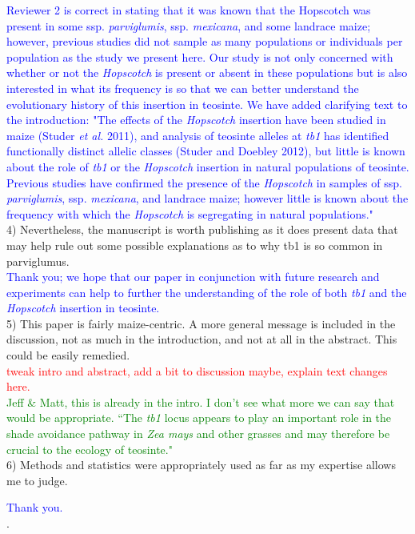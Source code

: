 \documentclass[11pt]{article}
\newcommand{\res}[1]{\noindent \textcolor{blue}{{#1}} \\}
\newcommand{\jri}[1]{\noindent \textcolor{red}{{#1}} \\}
\newcommand{\lev}[1]{\noindent \textcolor{green}{{#1}} \\}
\begin{document}
\res{Reviewer 2 is correct in stating that it was known that the Hopscotch was present in some ssp. \emph{parviglumis}, ssp. \emph{mexicana}, and some landrace maize; however, previous studies did not sample as many populations or individuals per population as the study we present here. Our study is not only concerned with whether or not the \emph{Hopscotch} is present or absent in these populations but is also interested in what its frequency is so that we can better understand the evolutionary history of this insertion in teosinte. We have added clarifying text to the introduction: "The effects of the \emph{Hopscotch} insertion have been studied in maize (Studer \emph{et al.} 2011), and analysis of teosinte alleles at \emph{tb1} has identified functionally distinct allelic classes (Studer and Doebley 2012), but little is known about the role of \emph{tb1} or the \emph{Hopscotch} insertion in natural populations of teosinte. Previous studies have confirmed the presence of the \emph{Hopscotch} in samples of ssp. \emph{parviglumis}, ssp. \emph{mexicana}, and landrace maize; however little is known about the frequency with which the \emph{Hopscotch} is segregating in natural populations."}


4) Nevertheless, the manuscript is worth publishing as it does present data that may help rule out some possible explanations as to why tb1 is so common in parviglumus.\\

\res{Thank you; we hope that our paper in conjunction with future research and experiments can help to further the understanding of the role of both \emph{tb1} and the \emph{Hopscotch} insertion in teosinte.}

5) This paper is fairly maize-centric. A more general message is included in the discussion, not as much in the introduction, and not at all in the abstract. This could be easily remedied.\\

\jri{tweak intro and abstract, add a bit to discussion maybe, explain text changes here.}
\lev{Jeff & Matt, this is already in the intro. I don't see what more we can say that would be appropriate. ``The \emph{tb1} locus appears to play an important role in the shade avoidance pathway in \emph{Zea mays} and other grasses and may therefore be crucial to the ecology of teosinte."}

6) Methods and statistics were appropriately used as far as my expertise allows me to judge.

\res{Thank you.}. 
\end{document}
